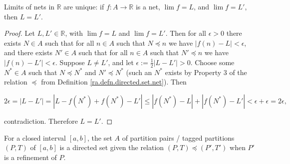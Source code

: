 \begin{proposition} 
Limits of nets in $\mathbb{R}$ are unique: if $f: A \to \mathbb{R}$ is a net, $\lim f = L$, and $\lim f = L'$, then $L = L'$. 
\end{proposition}

\begin{proof}

Let \(L, L' \in \mathbb{R}\), with \(\lim f = L\) and \(\lim f = L'\). Then for all \(\epsilon > 0\) there exists \(N \in A\) such that for all \(n \in A\) such that \( N \preceq n \) we have \(| f(n) - L| < \epsilon\), and there exists \(N' \in A\) such that for all \(n \in A\) such that \( N' \preceq n \) we have \(|f(n) - L'| < \epsilon\). Suppose \(L \neq L'\), and let \(\epsilon := \frac{1}{2}|L - L'| >0 \).  Choose some \(N^* \in A\) such that \(N \preceq N^*\) and \(N' \preceq N^*\) (such an \(N^*\) exists by Property 3 of the relation \(\preceq\) from Definition \ref{ra.defn.directed.set.net}). Then

\[
2 \epsilon = |L - L'| = |L - f(N^*) + f(N^*) - L'|  \leq |f(N^*) - L| + |f(N^*) - L'| < \epsilon +  \epsilon = 2 \epsilon,
\]

contradiction. Therefore \(L = L'\).

%

%
%

\end{proof}




\begin{proposition} 
For a closed interval $[a,b]$, the set $A$ of partition pairs / tagged partitions $(P,T)$ of $[a,b]$ is a directed set given the relation $(P,T) \preceq (P',T')$ when $P'$ is a refinement of $P$.
\end{proposition} 

